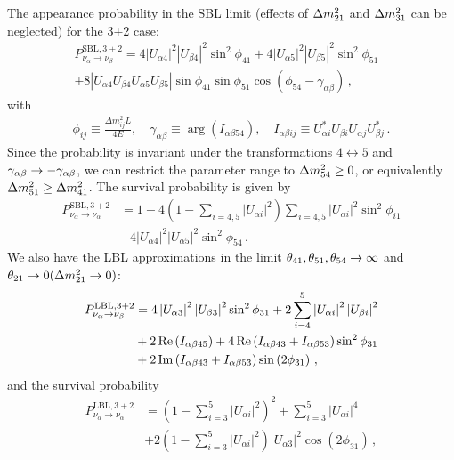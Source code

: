 \documentclass[twocolumn]{article}
\begin{document}
The appearance probability in the SBL limit (effects of $\dm[21]$ and $\dm[31]$ can be neglected) for the 3+2 case:
\begin{align*}
  P_{\nu_{\alpha} \rightarrow \nu_{\beta}}^{\mathrm{SBL}, 3+2}=4\left|U_{\alpha 4}\right|^{2}\left|U_{\beta 4}\right|^{2} \sin ^{2} \phi_{41}+4\left|U_{\alpha 5}\right|^{2}\left|U_{\beta 5}\right|^{2} \sin ^{2} \phi_{51} & \\
  +8\left|U_{\alpha 4} U_{\beta 4} U_{\alpha 5} U_{\beta 5}\right| \sin \phi_{41} \sin \phi_{51} \cos \left(\phi_{54}-\gamma_{\alpha \beta}\right)
\,,\end{align*}
with 
\begin{align*}
  \phi_{i j} \equiv \frac{\Delta m_{i j}^{2} L}{4 E}, \quad \gamma_{\alpha \beta} \equiv \arg \left(I_{\alpha \beta 54}\right), \quad I_{\alpha \beta i j} \equiv U_{\alpha i}^{*} U_{\beta i} U_{\alpha j} U_{\beta j}^{*}
\,.\end{align*}
Since the probability is invariant under the transformations $4 \leftrightarrow 5$ and $\gamma_{\alpha \beta} \to -\gamma_{\alpha \beta}$, we can restrict the parameter range to $\dm[54] \ge 0$, or equivalently $\dm[51] \ge \dm[41]$. 
The survival probability is given by
\begin{align*}
  P_{\nu_{\alpha} \rightarrow \nu_{\alpha}}^{\mathrm{SBL}, 3+2}
  &=1-4\left(1-\sum_{i=4,5}\left|U_{\alpha i}\right|^{2}\right) \sum_{i=4,5}\left|U_{\alpha i}\right|^{2} \sin ^{2} \phi_{i 1} \\
  &-4\left|U_{\alpha 4}\right|^{2}\left|U_{\alpha 5}\right|^{2} \sin ^{2} \phi_{54}
\,.\end{align*}
We also have the LBL approximations in the limit $\th[41], \th[51], \th[54] \to \infty$ and $\th[21] \to 0 (\dm[21] \to 0)$:
\begin{align*}
  P_{\nu_{\alpha} \rightarrow \nu_{\beta}}^{\mathrm{LBL}, 3+2}
  &= 4\left|U_{\alpha 3}\right|^{2} \abs{U_{\beta 3}}^{2} \sin ^{2} \phi_{31}+2 \sum_{i=4}^{5}\left|U_{\alpha i}\right|^{2}\left|U_{\beta i}\right|^{2}\\
  &+2 \operatorname{Re}\left(I_{\alpha \beta 45}\right)+4 \operatorname{Re}\left(I_{\alpha \beta 43}+I_{\alpha \beta 53}\right) \sin ^{2} \phi_{31} \\
  &+2 \operatorname{Im}\left(I_{\alpha \beta 43}+I_{\alpha \beta 53}\right) \sin \left(2 \phi_{31}\right)
\,,\end{align*}
and the survival probability
\begin{align*}
  P_{\nu_{\alpha} \rightarrow \nu_{\alpha}}^{\mathrm{LBL}, 3+2}
  &= \left(1-\sum_{i=3}^{5}\left|U_{\alpha i}\right|^{2}\right)^{2}+\sum_{i=3}^{5}\left|U_{\alpha i}\right|^{4} \\
  &+2\left(1-\sum_{i=3}^{5}\left|U_{\alpha i}\right|^{2}\right)\left|U_{\alpha 3}\right|^{2} \cos \left(2 \phi_{31}\right)
\,,\end{align*}
\end{document}
